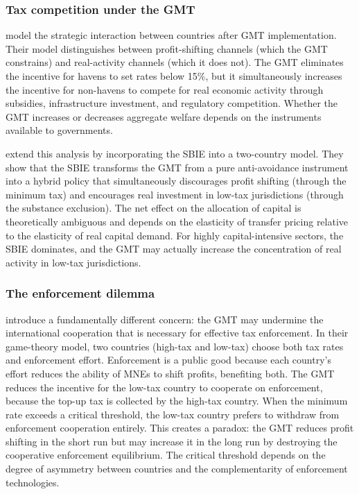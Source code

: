 \documentclass[11pt,a4paper]{article}
\begin{document}
\subsubsection{Tax competition under the GMT}

\citet{janeba2023} model the strategic interaction between countries after GMT implementation. Their model distinguishes between profit-shifting channels (which the GMT constrains) and real-activity channels (which it does not). The GMT eliminates the incentive for havens to set rates below 15\%, but it simultaneously increases the incentive for non-havens to compete for real economic activity through subsidies, infrastructure investment, and regulatory competition. Whether the GMT increases or decreases aggregate welfare depends on the instruments available to governments.

\citet{schjelderup2024} extend this analysis by incorporating the SBIE into a two-country model. They show that the SBIE transforms the GMT from a pure anti-avoidance instrument into a hybrid policy that simultaneously discourages profit shifting (through the minimum tax) and encourages real investment in low-tax jurisdictions (through the substance exclusion). The net effect on the allocation of capital is theoretically ambiguous and depends on the elasticity of transfer pricing relative to the elasticity of real capital demand. For highly capital-intensive sectors, the SBIE dominates, and the GMT may actually increase the concentration of real activity in low-tax jurisdictions.

\subsubsection{The enforcement dilemma}

\citet{hindriks2025} introduce a fundamentally different concern: the GMT may undermine the international cooperation that is necessary for effective tax enforcement. In their game-theory model, two countries (high-tax and low-tax) choose both tax rates and enforcement effort. Enforcement is a public good because each country's effort reduces the ability of MNEs to shift profits, benefiting both. The GMT reduces the incentive for the low-tax country to cooperate on enforcement, because the top-up tax is collected by the high-tax country. When the minimum rate exceeds a critical threshold, the low-tax country prefers to withdraw from enforcement cooperation entirely. This creates a paradox: the GMT reduces profit shifting in the short run but may increase it in the long run by destroying the cooperative enforcement equilibrium. The critical threshold depends on the degree of asymmetry between countries and the complementarity of enforcement technologies.
\end{document}
